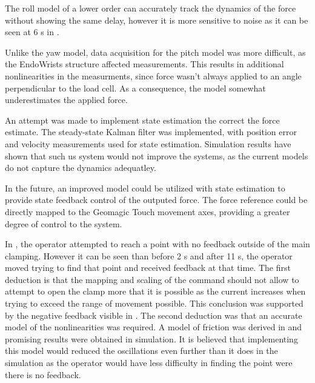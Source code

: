 The roll model of a lower order can accurately track the dynamics of the force without showing the same delay, however it is more sensitive to noise as it can be seen at 6 s in .

Unlike the yaw model, data acquisition for the pitch model was more difficult, as the EndoWrists structure affected measurements.
This results in additional nonlinearities in the measurments, since force wasn't always applied to an angle perpendicular to the load cell.
As a consequence, the model somewhat underestimates the applied force.

An attempt was made to implement state estimation the correct the force estimate.
The steady-state Kalman filter was implemented, with position error and velocity measurements used for state estimation.
Simulation results have shown that such us system would not improve the systems, as the current models do not capture the dynamics adequatley.

In the future, an improved model could be utilized with state estimation to provide state feedback control of the outputed force.
The force reference could be directly mapped to the Geomagic Touch movement axes, providing a greater degree of control to the system.

In , the operator attempted to reach a point with no feedback outside of the main clamping. However it can be seen than before 2 s and after 11 s, the operator moved trying to find that point and received feedback at that time. The first deduction is that the mapping and scaling of the command should not allow to attempt to open the clamp more that it is possible as the current increases when trying to exceed the range of movement possible. This conclusion was supported by the negative feedback visible in . The second deduction was that an accurate model of the nonlinearities was required. A model of friction was derived in  and promising results were obtained in simulation. It is believed that implementing this model would reduced the oscillations even further than it does in the simulation as the operator would have less difficulty in finding the point were there is no feedback.

